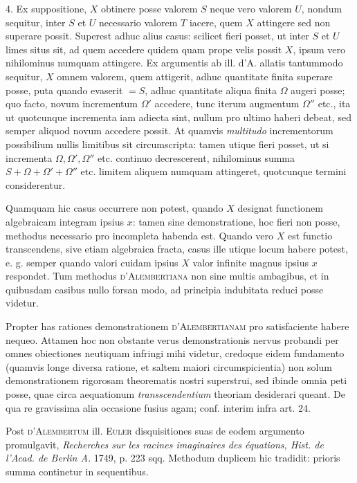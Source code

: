 4. Ex suppositione, $X$ obtinere posse valorem $S$ neque vero valorem $U$,
nondum sequitur, inter $S$ et $U$ necessario valorem $T$ iacere, quem $X$ attingere
sed non superare possit. Superest adhuc alius casus: scilicet fieri posset, ut inter $S$ et $U$ limes situs sit, ad quem accedere quidem quam prope velis possit $X$,
ipsum vero nihilominus numquam attingere. Ex argumentis ab ill. d'A. allatis
tantummodo sequitur, $X$ omnem valorem, quem attigerit, adhuc quantitate
finita superare posse, puta quando evaserit $=S$, adhuc quantitate aliqua finita
$\Omega$ augeri posse; quo facto, novum incrementum $\Omega'$ accedere, tunc iterum augmentum $\Omega''$ etc., ita ut quotcunque incrementa iam adiecta sint, nullum pro ultimo
haberi debeat, sed semper aliquod novum accedere possit. At quamvis \textit{multitudo}
incrementorum possibilium nullis limitibus sit circumscripta: tamen utique fieri
posset, ut si incrementa $\Omega,\Omega',\Omega''$ etc. continuo decrescerent, nihilominus summa
$S+\Omega+\Omega'+\Omega''$ etc. limitem aliquem numquam attingeret, quotcunque termini
considerentur.

Quamquam hic casus occurrere non potest, quando $X$ designat functionem
algebraicam integram ipsius $x$: tamen sine demonstratione, hoc fieri non posse,
methodus necessario pro incompleta habenda est. Quando vero $X$ est functio
transcendens, sive etiam algebraica fracta, casus ille utique locum habere potest,
e. g. semper quando valori cuidam ipsius $X$ valor infinite magnus ipsius $x$ respondet. Tum methodus \textsc{d'Alembertiana} non sine multis ambagibus, et in quibusdam
casibus nullo forsan modo, ad principia indubitata reduci posse videtur.

Propter has rationes demonstrationem \textsc{d'Alembertianam} pro satisfaciente
habere nequeo. Attamen hoc non obstante verus demonstrationis nervus probandi
per omnes obiectiones neutiquam infringi mihi videtur, credoque eidem fundamento (quamvis longe diversa ratione, et saltem maiori circumspicientia) non solum demonstrationem rigorosam theorematis nostri superstrui, sed ibinde omnia
peti posse, quae circa aequationum \textit{transscendentium} theoriam desiderari queant.
De qua re gravissima alia occasione fusius agam; conf. interim infra art. 24.

Post \textsc{d'Alembertum} ill. \textsc{Euler} disquisitiones suas de eodem argumento promulgavit, \textit{Recherches sur les racines imaginaires des équations, Hist. de l'Acad.
de Berlin A.} 1749, p. 223 sqq. Methodum duplicem hic tradidit: prioris summa
continetur in sequentibus.

